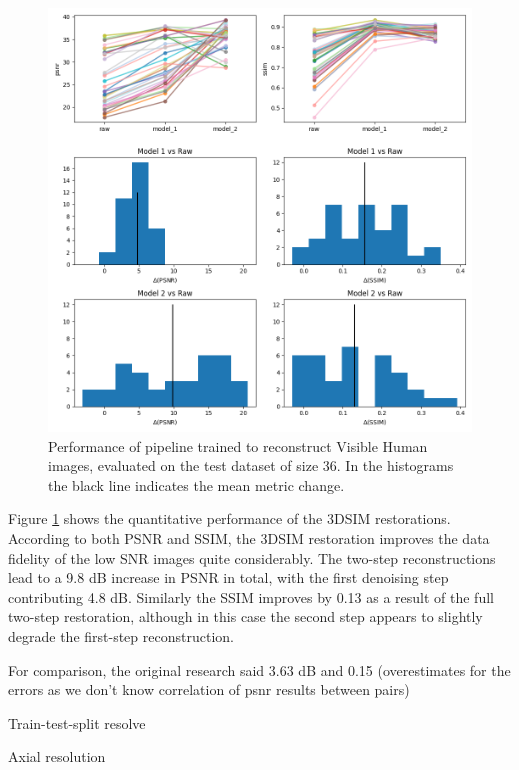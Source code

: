 \documentclass[12pt]{article}
\begin{document}
\begin{figure}[hbtp]
    \includegraphics[scale=0.55, center]{figures/m021_m022_pipeline_stats.png}
    \caption{Performance of pipeline trained to reconstruct Visible Human images, evaluated on the test dataset of size 36.
    In the histograms the black line indicates the mean metric change.}
    \label{fig:vh_stats}
\end{figure}

Figure \ref{fig:vh_stats} shows the quantitative performance of the 3DSIM restorations.
According to both PSNR and SSIM, the 3DSIM restoration improves the data fidelity of the low SNR images quite considerably.
The two-step reconstructions lead to a 9.8 dB increase in PSNR in total,
with the first denoising step contributing 4.8 dB.
Similarly the SSIM improves by 0.13 as a result of the full two-step restoration,
although in this case the second step appears to slightly degrade the first-step reconstruction.


For comparison, the original research said 3.63  dB and 0.15 (overestimates for the errors as we don't know correlation of psnr results between pairs)




Train-test-split resolve

Axial resolution
\end{document}
